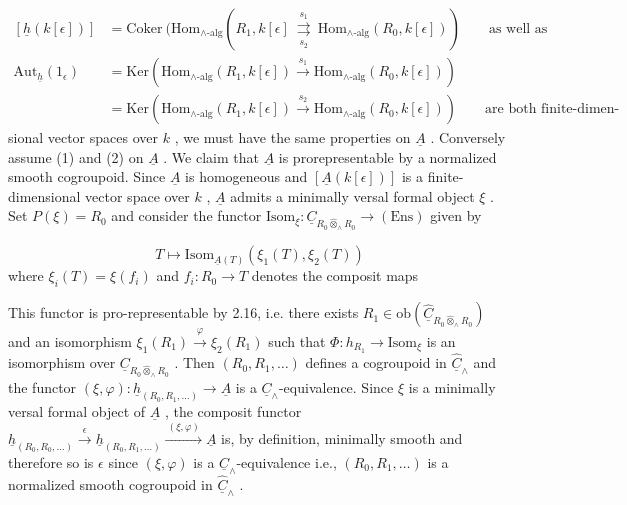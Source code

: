 \begin{equation*}
\begin{aligned}
[\underline{h}(k[\epsilon])] &= \mathrm{Coker}\ (\mathrm{Hom}_{\wedge\text{-alg}}(R_{1},k[\epsilon] \ \underset{s_{2}}{\overset{s_{1}}{\rightrightarrows}}\ \mathrm{Hom}_{\wedge\text{-alg}}(R_{0},k[\epsilon])) \qquad \text{as well as} \\[2ex]
\mathrm{Aut}_{\underline{h}}(1_{\epsilon}) &= \mathrm{Ker}(\mathrm{Hom}_{\wedge\text{-alg}}(R_{1},k[\epsilon]) \xrightarrow{\ s_{1}\ } \mathrm{Hom}_{\wedge\text{-alg}}(R_{0},k[\epsilon])) \\[2ex]
&= \mathrm{Ker}(\mathrm{Hom}_{\wedge\text{-alg}}(R_{1},k[\epsilon]) \xrightarrow{\ s_{2}\ } \mathrm{Hom}_{\wedge\text{-alg}}(R_{0},k[\epsilon])) \qquad \text{are both finite-dimen-}
\end{aligned}
\end{equation*}
sional vector spaces over  $k$  , we must have the same properties on  $\underline{A}$  . Conversely assume (1) and (2) on  $\underline{A}$  . We claim that  $\underline{A}$  is prorepresentable by a normalized smooth cogroupoid. Since  $\underline{A}$  is homogeneous and  $[\underline{A}(k[\epsilon])]$  is a finite-dimensional vector space over  $k$  ,  $\underline{A}$  admits a minimally versal formal object  $\xi$  . Set  $P(\xi) = R_{0}$  and consider the functor  $\mathrm{Isom}_{\xi} : \underline{C}_{R_{0} \hat{\otimes}_{\wedge} R_{0}} \to (\mathrm{Ens})$  given by

\begin{equation*}
T \longmapsto \mathrm{Isom}_{\underline{A}(T)}(\xi_{1}(T),\xi_{2}(T))
\end{equation*}
where  $\xi_{i}(T) = \xi(f_{i})$  and  $f_{i} : R_{0} \to T$  denotes the composit maps

\begin{center}
\end{center}
This functor is pro-representable by 2.16, i.e. there exists  $R_{1} \in \mathrm{ob}(\hat{\underline{C}}_{R_{0} \hat{\otimes}_{\wedge} R_{0}})$  and an isomorphism  $\xi_{1}(R_{1}) \xrightarrow{\ \varphi\ } \xi_{2}(R_{1})$  such that  $\Phi : h_{R_{1}} \to \mathrm{Isom}_{\xi}$  is an isomorphism over  $\underline{C}_{R_{0} \hat{\otimes}_{\wedge} R_{0}}$  . Then  $(R_{0},R_{1},\ldots)$  defines a cogroupoid in  $\hat{\underline{C}}_{\wedge}$  and the functor $(\xi,\varphi) : \underline{h}_{(R_{0},R_{1},\ldots)} \to \underline{A}$  is a  $\underline{C}_{\wedge}$-equivalence. Since  $\xi$  is a minimally versal formal object of  $\underline{A}$  , the composit functor  $\underline{h}_{(R_{0},R_{0},\ldots)} \xrightarrow{\ \epsilon\ } \underline{h}_{(R_{0},R_{1},\ldots)} \xrightarrow{\ (\xi,\varphi)\ } \underline{A}$ is, by definition, minimally smooth and therefore so is  $\epsilon$  since  $(\xi,\varphi)$  is a $\underline{C}_{\wedge}$-equivalence i.e.,  $(R_{0},R_{1},\ldots)$  is a normalized smooth cogroupoid in  $\hat{\underline{C}}_{\wedge}$  .



